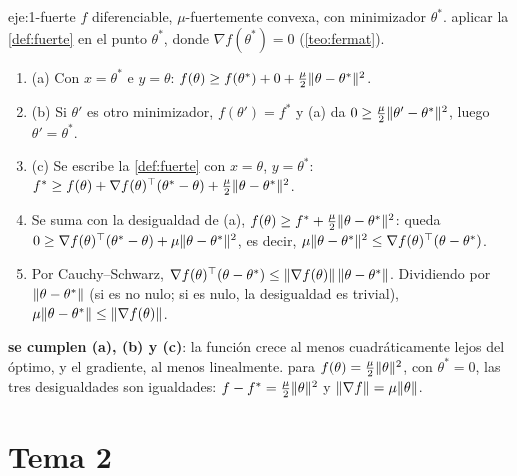 \begin{solucion}{eje:1-fuerte}
\datos $f$ diferenciable, $\mu$-fuertemente convexa, con minimizador $\theta^{\ast}$.
\planteamiento aplicar la \cref{def:fuerte} en el punto $\theta^{\ast}$, donde $\nabla f(\theta^{\ast})=0$ (\cref{teo:fermat}).
\pasos
\begin{enumerate}[label=\arabic*.]
  \item (a) Con $x=\theta^{\ast}$ e $y=\theta$: $f(\theta)\ge f(\theta^{\ast})+0+\frac{\mu}{2}\lVert\theta-\theta^{\ast}\rVert^{2}$.
  \item (b) Si $\theta'$ es otro minimizador, $f(\theta')=f^{\ast}$ y (a) da $0\ge\frac{\mu}{2}\lVert\theta'-\theta^{\ast}\rVert^{2}$, luego $\theta'=\theta^{\ast}$.
  \item (c) Se escribe la \cref{def:fuerte} con $x=\theta$, $y=\theta^{\ast}$: $f^{\ast}\ge f(\theta)+\nabla f(\theta)^{\top}(\theta^{\ast}-\theta)+\frac{\mu}{2}\lVert\theta-\theta^{\ast}\rVert^{2}$.
  \item Se suma con la desigualdad de (a), $f(\theta)\ge f^{\ast}+\frac{\mu}{2}\lVert\theta-\theta^{\ast}\rVert^{2}$: queda $0\ge\nabla f(\theta)^{\top}(\theta^{\ast}-\theta)+\mu\lVert\theta-\theta^{\ast}\rVert^{2}$, es decir, $\mu\lVert\theta-\theta^{\ast}\rVert^{2}\le\nabla f(\theta)^{\top}(\theta-\theta^{\ast})$.
  \item Por Cauchy--Schwarz, $\nabla f(\theta)^{\top}(\theta-\theta^{\ast})\le\lVert\nabla f(\theta)\rVert\,\lVert\theta-\theta^{\ast}\rVert$. Dividiendo por $\lVert\theta-\theta^{\ast}\rVert$ (si es no nulo; si es nulo, la desigualdad es trivial), $\mu\lVert\theta-\theta^{\ast}\rVert\le\lVert\nabla f(\theta)\rVert$.
\end{enumerate}
\resultado \textbf{se cumplen (a), (b) y (c)}: la función crece al menos cuadráticamente lejos del óptimo, y el gradiente, al menos linealmente.
\comprobacion para $f(\theta)=\frac{\mu}{2}\lVert\theta\rVert^{2}$, con $\theta^{\ast}=0$, las tres desigualdades son igualdades: $f-f^{\ast}=\frac{\mu}{2}\lVert\theta\rVert^{2}$ y $\lVert\nabla f\rVert=\mu\lVert\theta\rVert$.
\end{solucion}

\section{Tema 2}

